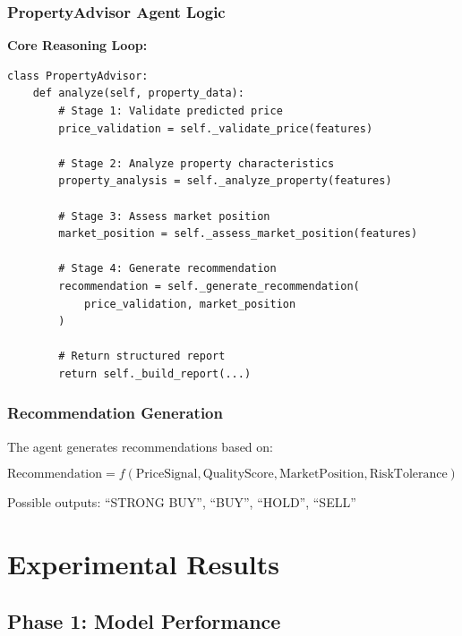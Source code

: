\documentclass[11pt,a4paper]{article}
\begin{document}
\subsubsection{PropertyAdvisor Agent Logic}

\textbf{Core Reasoning Loop:}

\begin{lstlisting}
class PropertyAdvisor:
    def analyze(self, property_data):
        # Stage 1: Validate predicted price
        price_validation = self._validate_price(features)
        
        # Stage 2: Analyze property characteristics
        property_analysis = self._analyze_property(features)
        
        # Stage 3: Assess market position
        market_position = self._assess_market_position(features)
        
        # Stage 4: Generate recommendation
        recommendation = self._generate_recommendation(
            price_validation, market_position
        )
        
        # Return structured report
        return self._build_report(...)
\end{lstlisting}

\subsubsection{Recommendation Generation}

The agent generates recommendations based on:

\begin{equation}
\text{Recommendation} = f(\text{PriceSignal}, \text{QualityScore}, \text{MarketPosition}, \text{RiskTolerance})
\end{equation}

Possible outputs: ``STRONG BUY'', ``BUY'', ``HOLD'', ``SELL''

\pagebreak

\section{Experimental Results}

\subsection{Phase 1: Model Performance}
\end{document}
